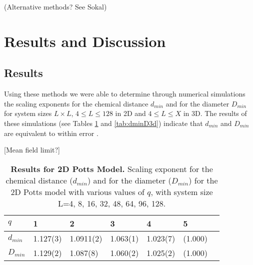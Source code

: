 \documentclass[pre,preprint]{revtex4}
\begin{document}
(Alternative methods? See Sokal)

\section{Results and Discussion}

\subsection{Results}
Using these methods we were able to determine through numerical simulations the scaling exponents for the chemical distance $d_{min}$ and for the diameter $D_{min}$ for system sizes $L \times  L$, $4 \le L \le 128$ in 2D and   $4 \le L \le X$ in 3D.  The results of these simulations (see Tables \ref{tab:dminD2d} and \ref{tab:dminD3d}) indicate that $d_{min}$ and $D_{min}$ are equivalent to within error .  




[Mean field limit?]



\begin{table}[h]
\begin{center}
\begin{tabular}{| l | l | l | l | l | l | l |}
\hline
$q$ & 1 & 2 & 3 & 4 & 5\\
\hline
$d_{min}$ & 1.127(3) & 1.0911(2) & 1.063(1) & 1.023(7) & (1.000) \\
\hline
$D_{min}$ & 1.129(2) & 1.087(8) & 1.060(2) & 1.025(2)& (1.000) \\

\hline
\end{tabular}
\caption{\label{tab:dminD2d} {\bf Results for 2D Potts Model.} Scaling exponent for the chemical distance ($d_{min}$) and for the diameter ($D_{min}$) for the 2D Potts model with various values of $q$, with system size L=4, 8, 16, 32, 48, 64, 96, 128.}
\end{center}
\end{table}
\end{document}
